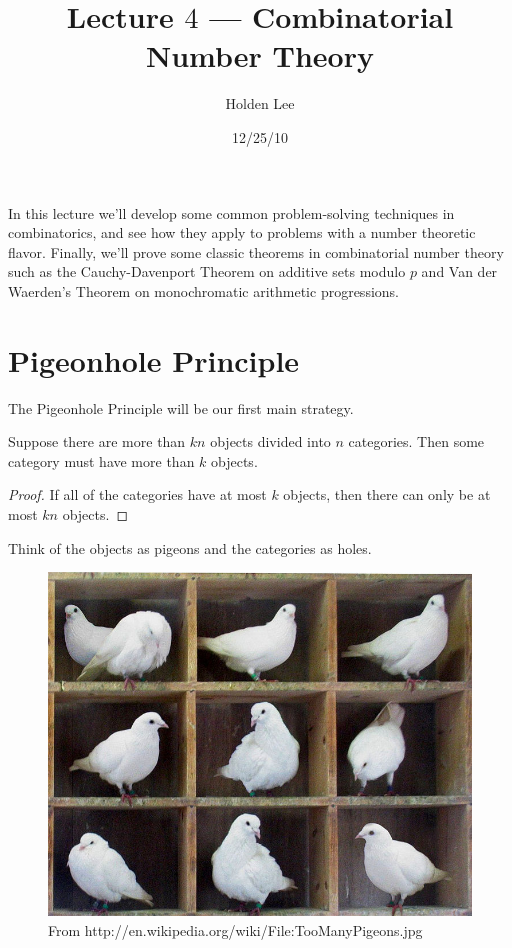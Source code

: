 
\usepackage{hyperref}
\pagestyle{fancy}





\title{Lecture $4$ --- Combinatorial Number Theory}%
\author{Holden Lee}
\date{12/25/10}%
\maketitle
\thispagestyle{empty}
In this lecture we'll develop some common problem-solving techniques in combinatorics, and see how they apply to problems with a number theoretic flavor. Finally, we'll prove some classic theorems in combinatorial number theory such as the Cauchy-Davenport Theorem on additive sets modulo $p$ and Van der Waerden's Theorem on monochromatic arithmetic progressions.
\section{Pigeonhole Principle}
The Pigeonhole Principle will be our first main strategy.
\begin{thm}
Suppose there are more than $kn$ objects divided into $n$ categories. Then some category must have more than $k$ objects.
\end{thm}
\begin{proof}
If all of the categories have at most $k$ objects, then there can only be at most $kn$ objects. 
\end{proof}
Think of the objects as pigeons and the categories as holes.

\begin{figure}[h!]
\centering
\includegraphics[scale=0.5]{toomanypigeons}
\caption{From http://en.wikipedia.org/wiki/File:TooManyPigeons.jpg}
\end{figure}

